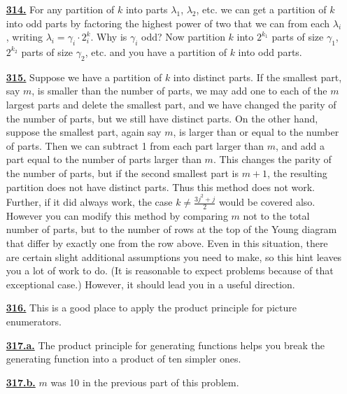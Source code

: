 \documentclass[10pt,]{book}
\theoremstyle{plain}
\theoremstyle{definition}
\theoremstyle{definition}
\theoremstyle{definition}
\numberwithin{equation}{chapter}
\begin{document}
\begin{itemize}[itemsep=1em]
\hypertarget{a-314}{}\item[\textbf{\hyperref[activity-307]{314.}}]
\hypertarget{p-1552}{}%
For any partition of \(k\) into parts \(\lambda_1\), \(\lambda_2\), etc. we can get a partition of \(k\) into odd parts by factoring the highest power of two that we can from each \(\lambda_i\), writing \(\lambda_i = \gamma_i\cdot 2^k_i\).  Why is \(\gamma_i\) odd? Now partition \(k\) into \(2^{k_1}\) parts of size \(\gamma_1\), \(2^{k_2}\) parts of size \(\gamma_2\), etc. and you have a partition of \(k\) into odd parts.%

\hypertarget{a-315}{}\item[\textbf{\hyperref[activity-308]{315.}}]
\hypertarget{p-1556}{}%
Suppose we have a partition of \(k\) into distinct parts. If the smallest part, say \(m\), is smaller than the number of parts, we may add one to each of the \(m\) largest parts and delete the smallest part, and we have changed the parity of the number of parts, but we still have distinct parts. On the other hand, suppose the smallest part, again say \(m\), is larger than or equal to the number of parts. Then we can subtract 1 from each part larger than \(m\), and add a part equal to the number of parts larger than \(m\). This changes the parity of the number of parts, but if the second smallest part is \(m+1\), the resulting partition does not have distinct parts. Thus this method does not work. Further, if it did always work, the case \(k \ne \frac{3j^2+j}{2}\) would be covered also. However you can modify this method by comparing \(m\) not to the total number of parts, but to the number of rows at the top of the Young diagram that differ by exactly one from the row above. Even in this situation, there are certain slight additional assumptions you need to make, so this hint leaves you a lot of work to do. (It is reasonable to expect problems because of that exceptional case.) However, it should lead you in a useful direction.%

\hypertarget{a-316}{}\item[\textbf{\hyperref[change-making]{316.}}]
\hypertarget{p-1563}{}%
This is a good place to apply the product principle for picture enumerators.%

\hypertarget{a-317.a}{}\item[\textbf{\hyperref[task-269]{317.a.}}]
\hypertarget{p-1569}{}%
The product principle for generating functions helps you break the generating function into a product of ten simpler ones.%

\hypertarget{a-317.b}{}\item[\textbf{\hyperref[largestpartatmostm]{317.b.}}]
\hypertarget{p-1572}{}%
\(m\) was 10 in the previous part of this problem.%


\end{itemize}
\end{document}

